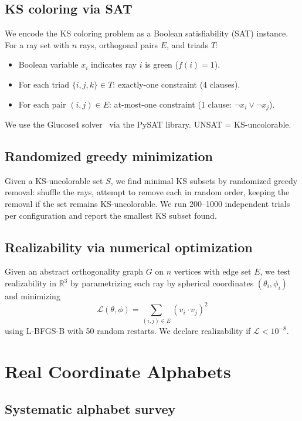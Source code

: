 \documentclass[12pt,a4paper]{article}
\newcommand{\R}{\mathbb{R}}
\begin{document}
\subsection{KS coloring via SAT}

We encode the KS coloring problem as a Boolean satisfiability (SAT) instance. For a ray set with $n$ rays, orthogonal pairs $E$, and triads $T$:

\begin{itemize}
    \item Boolean variable $x_i$ indicates ray $i$ is green ($f(i) = 1$).
    \item For each triad $\{i, j, k\} \in T$: exactly-one constraint (4 clauses).
    \item For each pair $(i, j) \in E$: at-most-one constraint (1 clause: $\neg x_i \lor \neg x_j$).
\end{itemize}

We use the Glucose4 solver~\cite{AudemardSimon2018} via the PySAT library. UNSAT = KS-uncolorable.

\subsection{Randomized greedy minimization}

Given a KS-uncolorable set $S$, we find minimal KS subsets by randomized greedy removal: shuffle the rays, attempt to remove each in random order, keeping the removal if the set remains KS-uncolorable. We run 200--1000 independent trials per configuration and report the smallest KS subset found.

\subsection{Realizability via numerical optimization}

Given an abstract orthogonality graph $G$ on $n$ vertices with edge set $E$, we test realizability in $\R^3$ by parametrizing each ray by spherical coordinates $(\theta_i, \phi_i)$ and minimizing
\[
\mathcal{L}(\theta, \phi) = \sum_{(i,j) \in E} (v_i \cdot v_j)^2
\]
using L-BFGS-B with 50 random restarts. We declare realizability if $\mathcal{L} < 10^{-8}$.

\section{Real Coordinate Alphabets}\label{sec:real}

\subsection{Systematic alphabet survey}
\end{document}
